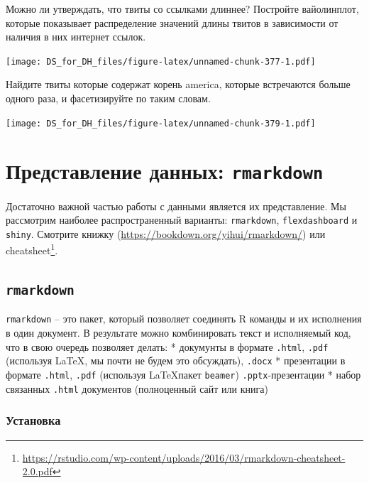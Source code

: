 \documentclass[
]{book}
\makeatletter
\renewcommand{\href}[2]{#2\footnote{\url{#1}}}
\newenvironment{kframe}{%
    \medskip{}
    \setlength{\fboxsep}{.8em}
    \def\at@end@of@kframe{}%
    \ifinner\ifhmode%
    \def\at@end@of@kframe{\end{minipage}}%
    \begin{minipage}{\columnwidth}%
    \fi\fi%
    \def\FrameCommand##1{\hskip\@totalleftmargin \hskip-\fboxsep
    \colorbox{shadecolor}{##1}\hskip-\fboxsep
        \hskip-\linewidth \hskip-\@totalleftmargin \hskip\columnwidth}%
    \MakeFramed {\advance\hsize-\width
      \@totalleftmargin\z@ \linewidth\hsize
      \@setminipage}}%
  {\par\unskip\endMakeFramed%
    \at@end@of@kframe}
\newenvironment{rmdblock}[1]
  {
    \begin{itemize}
    \renewcommand{\labelitemi}{
      \raisebox{-.7\height}[0pt][0pt]{
        {\setkeys{Gin}{width=3em,keepaspectratio}\texttt{[image: images/\#1]}}
        }
        }
        \setlength{\fboxsep}{1em}
        \begin{kframe}
        \item
      }
      {
        \end{kframe}
        \end{itemize}
      }
\newenvironment{rmdtask}
      {\begin{rmdblock}{task}}
      {\end{rmdblock}}
\makeatother
\begin{document}
\begin{rmdtask}
Можно ли утверждать, что твиты со ссылками длиннее? Постройте
вайолинплот, которые показывает распределение значений длины твитов в
зависимости от наличия в них интернет ссылок.
\end{rmdtask}

\texttt{[image: DS\_for\_DH\_files/figure-latex/unnamed-chunk-377-1.pdf]}

\begin{rmdtask}
Найдите твиты которые содержат корень america, которые встречаются
больше одного раза, и фасетизируйте по таким словам.
\end{rmdtask}

\texttt{[image: DS\_for\_DH\_files/figure-latex/unnamed-chunk-379-1.pdf]}

\hypertarget{data_presentation}{%
\chapter{\texorpdfstring{Представление данных: \texttt{rmarkdown}}{Представление данных: rmarkdown}}\label{data_presentation}}

Достаточно важной частью работы с данными является их представление. Мы рассмотрим наиболее распространенный варианты: \texttt{rmarkdown}, \texttt{flexdashboard} и \texttt{shiny}. Смотрите книжку \citep{xie19}(\url{https://bookdown.org/yihui/rmarkdown/}) или \href{https://rstudio.com/wp-content/uploads/2016/03/rmarkdown-cheatsheet-2.0.pdf}{cheatsheet}.

\hypertarget{rmarkdown}{%
\section{\texorpdfstring{\texttt{rmarkdown}}{rmarkdown}}\label{rmarkdown}}

\texttt{rmarkdown} -- это пакет, который позволяет соединять R команды и их исполнения в один документ. В результате можно комбинировать текст и исполняемый код, что в свою очередь позволяет делать:
* докумунты в формате \texttt{.html}, \texttt{.pdf} (используя \LaTeX, мы почти не будем это обсуждать), \texttt{.docx}
* презентации в формате \texttt{.html}, \texttt{.pdf} (используя \LaTeX пакет \texttt{beamer}) \texttt{.pptx}-презентации
* набор связанных \texttt{.html} документов (полноценный сайт или книга)

\hypertarget{ux443ux441ux442ux430ux43dux43eux432ux43aux430}{%
\subsection{Установка}\label{ux443ux441ux442ux430ux43dux43eux432ux43aux430}}
\end{document}
